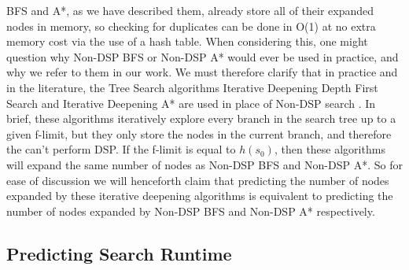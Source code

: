 \documentclass{article}
\begin{document}
BFS and A*, as we have described them, already store all of their expanded nodes in memory, so checking for duplicates can be done in O(1) at no extra memory cost via the use of a hash table. When considering this,
one might question why Non-DSP BFS or Non-DSP A* would ever be used in practice,
and why we refer to them in our work. We must therefore clarify that in practice and in the literature,
the Tree Search algorithms Iterative Deepening Depth First Search and Iterative Deepening A* are used in place of Non-DSP search \cite{korf1985depth}. In brief, these algorithms iteratively explore every branch in the search tree up to a given f-limit, but they only store
the nodes in the current branch, and therefore the can't perform DSP. If the f-limit is equal to \(h(s_0)\), then these algorithms will expand the same number of nodes as Non-DSP BFS and Non-DSP A*. So for ease of discussion we will henceforth claim that predicting the number of nodes expanded by these iterative deepening algorithms is equivalent to predicting the number of nodes expanded by Non-DSP BFS and Non-DSP A* respectively.

\subsection{Predicting Search Runtime}
\end{document}
